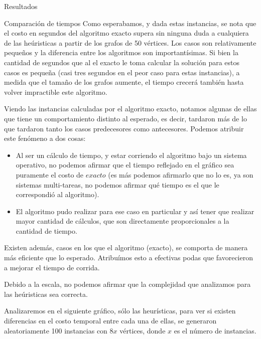 \documentclass[12pt,titlepage]{article}
\newcommand{\VSP}{\vspace*{3em}}
\begin{document}
\begin{section}{Resultados}
\begin{subsection}{Comparación de tiempos}
		Como esperabamos, y dada estas instancias, se nota que el costo en segundos del algoritmo exacto supera sin ninguna duda a cualquiera de las heúristicas a partir de los grafos de 50 vértices. Los casos son relativamente pequeños y la diferencia entre los algoritmos son importantísimas. Si bien la cantidad de segundos que al el exacto le toma calcular la solución para estos casos es pequeña (casi tres segundos en el peor caso para estas instancias), a medida que el tamaño de los grafos aumente, el tiempo crecerá también hasta volver impractible este algoritmo.

		Viendo las instancias calculadas por el algoritmo exacto, notamos algunas de ellas que tiene un comportamiento distinto al esperado, es decir, tardaron más de lo que tardaron tanto los casos predecesores como antecesores. Podemos atribuir este fenómeno a dos cosas:

			\begin{itemize}
				\item Al ser un cálculo de tiempo, y estar corriendo el algoritmo bajo un sistema operativo, no podemos afirmar que el tiempo reflejado en el gráfico sea puramente el costo de $exacto$ (es más podemos afirmarlo que no lo es, ya son sistemas multi-tareas, no podemos afirmar qué tiempo es el que le correspondió al algoritmo).
				\item El algoritmo pudo realizar para ese caso en particular y así tener que realizar mayor cantidad de cálculos, que son directamente proporcionales a la cantidad de tiempo.
			\end{itemize}

		Existen además, casos en los que el algoritmo (exacto), se comporta de manera más eficiente que lo esperado. Atribuímos esto a efectivas podas que favorecieron a mejorar el tiempo de corrida.

		Debido a la escala, no podemos afirmar que la complejidad que analizamos para las heúristicas sea correcta.\VSP

		Analizaremos en el siguiente gráfico, sólo las heurísticas, para ver si existen diferencias en el costo temporal entre cada una de ellas, se generaron aleatoriamente 100 instancias con $8x$ vértices, donde $x$ es el número de instancias.	
		

\end{subsection}
\end{section}
\end{document}
